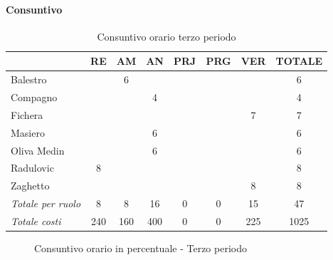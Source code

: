 \documentclass[a4paper,12pt]{article}
\begin{document}
            \paragraph{Consuntivo}
                \begin{table}[H]
                \centering
                \begin{tabular}{|l|c|c|c|c|c|c|c|}
                \hline
                    \rowcolor{lightgray}{\textbf{Membro}} & {\textbf{RE}} & {\textbf{AM}} & {\textbf{AN}} & {\textbf{PRJ}} & {\textbf{PRG}} & {\textbf{VER}} & {\textbf{TOTALE}}\\
                \hline
                    Balestro & & 6 & & & & & 6\\
                \hline
                    Compagno & & & 4 & & & & 4\\
                \hline
                    Fichera & & & & & & 7 & 7\\
                \hline
                    Masiero & & & 6 & & & & 6\\
                \hline
                    Oliva Medin & & & 6 & & & & 6\\
                \hline
                    Radulovic & 8 & & & & & & 8\\
                \hline
                    Zaghetto & & & & & & 8 & 8\\
                \hline
                    \rowcolor{lightgray}\textit{Totale per ruolo} & 8 & 8 & 16 & 0 & 0 & 15 & 47\\
                \hline
                    \rowcolor{lightgray}\textit{Totale costi} & 240 & 160 & 400 & 0 & 0 & 225 & 1025\\
                \hline
                \end{tabular}
                \caption{Consuntivo orario terzo periodo}
                \end{table}

                \begin{figure}[H]
                \centering
                \caption{Consuntivo orario in percentuale - Terzo periodo}
                \end{figure}
                
\end{document}
